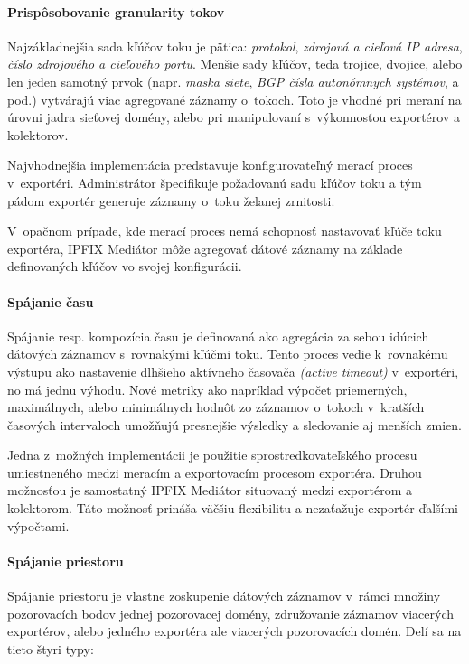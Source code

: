 \paragraph{Prispôsobovanie granularity tokov}

Najzákladnejšia sada kľúčov toku je pätica: \emph{protokol}, \emph{zdrojová a cieľová IP adresa}, 
\emph{číslo zdrojového a cieľového portu}. Menšie sady kľúčov, teda trojice, dvojice, alebo len jeden 
samotný prvok (napr. \emph{maska siete}, \emph{BGP čísla autonómnych systémov}, a pod.) vytvárajú viac 
agregované záznamy o~tokoch. Toto je vhodné pri meraní na úrovni 
jadra sieťovej domény, alebo pri manipulovaní s~výkonnosťou exportérov a kolektorov.

Najvhodnejšia implementácia predstavuje konfigurovateľný merací proces v~exportéri. Administrátor 
špecifikuje požadovanú sadu kľúčov toku a tým pádom exportér generuje záznamy o~toku želanej zrnitosti.

V~opačnom prípade, kde merací proces nemá schopnosť nastavovať kľúče toku exportéra, IPFIX Mediátor 
môže agregovať dátové záznamy na základe definovaných kľúčov vo svojej konfigurácii.


\paragraph{Spájanie času}

Spájanie resp. kompozícia času je definovaná ako agregácia za sebou idúcich dátových záznamov s~rovnakými
kľúčmi toku. Tento proces vedie k~rovnakému výstupu ako nastavenie dlhšieho aktívneho časovača
\emph{(active timeout)} v~exportéri, no má jednu výhodu. Nové metriky ako napríklad výpočet priemerných, 
maximálnych, alebo minimálnych hodnôt zo záznamov o~tokoch v~kratších časových intervaloch umožňujú 
presnejšie výsledky a sledovanie aj menších zmien.

Jedna z~možných implementácii je použitie sprostredkovateľského procesu umiestneného medzi 
meracím a exportovacím procesom exportéra. Druhou možnosťou je samostatný IPFIX Mediátor situovaný medzi
exportérom a kolektorom. Táto možnosť prináša väčšiu flexibilitu a nezaťažuje exportér ďalšími výpočtami.


\paragraph{Spájanie priestoru} \label{sec:spatial}

Spájanie priestoru je vlastne zoskupenie dátových záznamov v~rámci množiny pozorovacích bodov jednej 
pozorovacej domény, združovanie záznamov viacerých exportérov, alebo jedného exportéra ale viacerých 
pozorovacích domén. Delí sa na tieto štyri typy:

